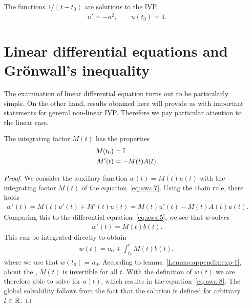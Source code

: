 \begin{example}
  The functions $1/(t-t_0)$ are solutions to the IVP
  \begin{gather*}
    u'=-u^2, \qquad u(t_0) = 1.
  \end{gather*}
\end{example}

\section{Linear differential equations
  and Grönwall's inequality}

\begin{intro}
  The examination of linear differential equation turns out to be
  particularly simple. On the other hand, results obtained here will
  provide us with important statements for general non-linear
  IVP. Therefore we pay particular attention to the linear case.
\end{intro}




\begin{corollary}
  The integrating factor $M(t)$ has the properties
  \begin{align}
    \label{eq:awa:14}
    M(t_0) &= \mathbb I\\
    \label{eq:awa:15}
    M'(t) &= -M(t)A(t).
  \end{align}
\end{corollary}



\begin{proof}
  We consider the auxiliary function $w(t) = M(t) u(t)$ with the
  integrating factor $M(t)$ of the equation~\eqref{eq:awa:7}. Using the
  chain rule, there holds
  \begin{gather}
    \label{eq:awa:19}
    w'(t) =  M(t) u'(t) + M'(t) u(t)
    =  M(t) u'(t) - M(t)A(t)u(t).
  \end{gather}
  Comparing this to the differential equation~\eqref{eq:awa:5}, we see
  that $w$ solves
  \begin{gather*}
    w'(t) = M(t) b(t).
  \end{gather*}
	This can be integrated directly to obtain	
  \begin{gather*}
    w(t) = u_0 + \int_{t_0}^t M(t) b(t),
  \end{gather*}
  where we use that $w(t_0) = u_0$.  According to
  lemma~\ref{Lemma:appendix:exp-1}, about the , $M(t)$ is invertible for all $t$.  With the
  definition of $w(t)$ we are therefore able to solve for $u(t)$,
  which results in the equation~\eqref{eq:awa:8}. The global
  solvability follows from the fact that the solution is defined for
  arbitrary $t\in \mathbb R$.
\end{proof}


